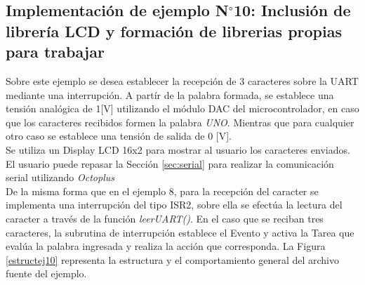 \documentclass[12pt,letterpaper]{article}
\begin{document}
\subsection{Implementación de ejemplo N$^{\circ}$10: Inclusión de librería LCD y formación de librerias propias para trabajar}

Sobre este ejemplo se desea establecer la recepción de 3 caracteres sobre la UART mediante una interrupción. A partír de la palabra formada, se establece una tensión analógica de 1[V] utilizando el módulo DAC del microcontrolador, en caso que los caracteres recibidos formen la palabra \textit{UNO}. Mientras que para cualquier otro caso se establece una tensión de salida de 0 [V].
 \\
 
Se utiliza un Display LCD 16x2 para mostrar al usuario los caracteres enviados. El usuario puede repasar la Sección \ref{sec:serial} para realizar la comunicación serial utilizando \textit{Octoplus}
 \\
 
De la misma forma que en el ejemplo 8, para la recepción del caracter se implementa una interrupción del tipo ISR2, sobre ella se efectúa la lectura del caracter a través de la función \textit{leerUART()}. En el caso que se reciban tres caracteres, la subrutina de interrupción establece el Evento y activa la Tarea que evalúa la palabra ingresada y realiza la acción que corresponda. La  Figura \ref{estructej10} representa la estructura y el comportamiento general del archivo fuente del ejemplo.
\end{document}
